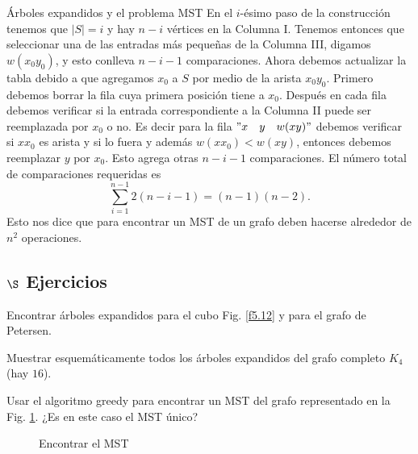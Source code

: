 \begin{section}{Árboles expandidos y el problema MST}
En el $i$-ésimo paso de la construcción tenemos que $|S|=i$ y hay $n-i$ vértices en la Columna I. Tenemos entonces que seleccionar una de las entradas más pequeñas de la Columna III, digamos $w(x_0y_0)$, y esto conlleva $n-i-1$ comparaciones. Ahora debemos actualizar la tabla debido a que agregamos $x_0$ a $S$ por medio
de la arista $x_0y_0$. Primero debemos borrar la fila cuya primera posición tiene a $x_0$. Después en cada fila debemos verificar si la entrada correspondiente a la Columna II puede ser reemplazada por $x_0$ o no. Es decir para la fila $"x\quad y \quad w(xy)"$ debemos verificar si $xx_0$ es arista y si lo fuera y además $w(xx_0) < w(xy)$, entonces debemos reemplazar $y$ por $x_0$. Esto agrega otras $n-i-1$ comparaciones. El número total de comparaciones requeridas es
$$
\sum_{i=1}^{n-1} 2(n-i-1) = (n-1)(n-2).
$$
Esto nos dice que para encontrar un MST de un grafo deben hacerse alrededor de $n^2$ operaciones.

\subsection*{$\S$ Ejercicios}
\begin{enumex}
    \item Encontrar árboles expandidos para el cubo Fig. \ref{f5.12} y para el grafo de Petersen.

    \item Muestrar esquemáticamente todos los árboles expandidos del grafo completo $K_4$ (hay $16$).    

    \item Usar el algoritmo greedy para encontrar un MST del grafo representado en la Fig. \ref{f6.5}. ¿Es en este caso el MST único?
    \begin{figure}[ht]
    \begin{center}
    \end{center}
    \caption{Encontrar el MST} \label{f6.5}
\end{figure}


\end{enumex}
\end{section}
